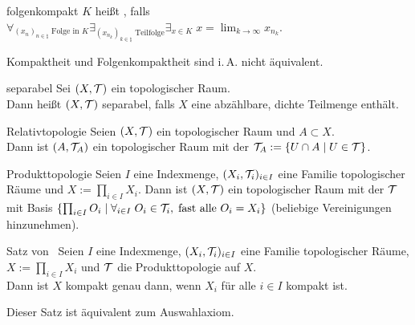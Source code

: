 \begin{Def}{folgenkompakt}
    $K$ heißt , falls\\
    $\forall_{(x_n)_{n \in \natural} \text{ Folge in } K}
    \exists_{(x_{n_k})_{k \in \natural} \text{ Teilfolge}} \exists_{x \in K}\;
    x = \lim_{k \to \infty} x_{n_k}$.
\end{Def}

\begin{Bem}
    Kompaktheit und Folgenkompaktheit sind i.\,A. nicht äquivalent.
\end{Bem}

\linie

\begin{Def}{separabel}
    Sei $(X, \mathcal{T})$ ein topologischer Raum.\\
    Dann heißt $(X, \mathcal{T})$ separabel, falls $X$ eine abzählbare, dichte Teilmenge enthält.
\end{Def}

\linie

\begin{Satz}{Relativtopologie}
    Seien $(X, \mathcal{T})$ ein topologischer Raum und $A \subset X$.\\
    Dann ist $(A, \mathcal{T}_A)$ ein topologischer Raum mit der 
    $\mathcal{T}_A := \{U \cap A \;|\; U \in \mathcal{T}\}$.
\end{Satz}

\begin{Satz}{Produkttopologie}
    Seien $I$ eine Indexmenge, $(X_i, \mathcal{T}_i)_{i \in I}$ eine Familie topologischer Räume und
    $X := \prod_{i \in I} X_i$.
    Dann ist $(X, \mathcal{T})$ ein topologischer Raum mit der  $\mathcal{T}$ mit Basis
    $\{\prod_{i \in I} O_i \;|\; \forall_{i \in I}\; O_i \in \mathcal{T}_i,\;
    \text{fast alle } O_i = X_i\}$
    (beliebige Vereinigungen hinzunehmen).
\end{Satz}

\begin{Satz}{Satz von \scshape\,\!}
    Seien $I$ eine Indexmenge, $(X_i, \mathcal{T}_i)_{i \in I}$ eine Familie topologischer Räume,
    $X := \prod_{i \in I} X_i$ und $\mathcal{T}$ die Produkttopologie auf $X$.\\
    Dann ist $X$ kompakt genau dann, wenn $X_i$ für alle $i \in I$ kompakt ist.
\end{Satz}

\begin{Bem}
    Dieser Satz ist äquivalent zum Auswahlaxiom.
\end{Bem}

